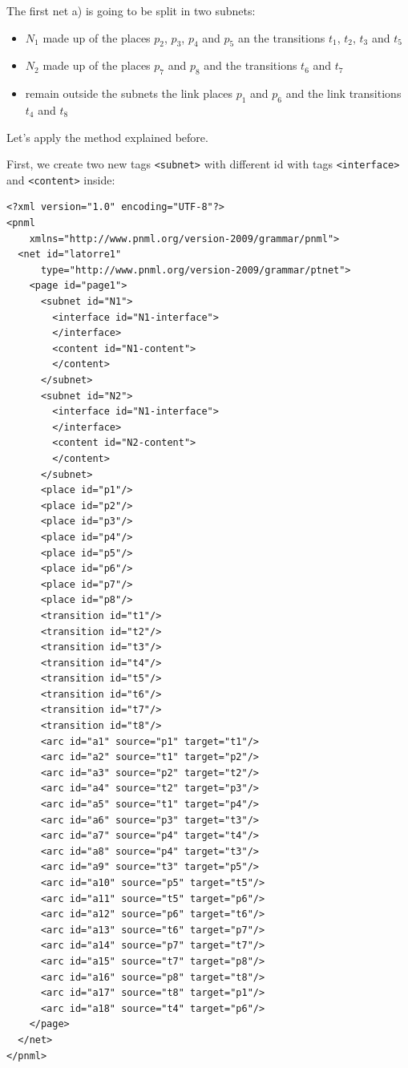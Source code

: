 The first net a) is going to be split in two subnets:
\begin{itemize}
\item $N_1$ made up of the places $p_2$, $p_3$, $p_4$ and $p_5$ an the transitions
$t_1$, $t_2$, $t_3$ and $t_5$
\item $N_2$ made up of the places $p_7$ and $p_8$ and the transitions $t_6$
and $t_7$
\item remain outside the subnets the link places $p_1$ and $p_6$ and the link transitions $t_4$ and $t_8$
\end{itemize}

Let's apply the method explained before.

First, we create two new tags \texttt{<subnet>} with different id with tags
\texttt{<interface>} and  \texttt{<content>} inside:

\begin{lstlisting}
<?xml version="1.0" encoding="UTF-8"?>
<pnml
    xmlns="http://www.pnml.org/version-2009/grammar/pnml">
  <net id="latorre1"
      type="http://www.pnml.org/version-2009/grammar/ptnet">
    <page id="page1">
      <subnet id="N1">
        <interface id="N1-interface">
        </interface>
        <content id="N1-content">
        </content>
      </subnet>
      <subnet id="N2">
        <interface id="N1-interface">
        </interface>
        <content id="N2-content">
        </content>
      </subnet>
      <place id="p1"/>
      <place id="p2"/>
      <place id="p3"/>
      <place id="p4"/>
      <place id="p5"/>
      <place id="p6"/>
      <place id="p7"/>
      <place id="p8"/>
      <transition id="t1"/>
      <transition id="t2"/>
      <transition id="t3"/>
      <transition id="t4"/>
      <transition id="t5"/>
      <transition id="t6"/>
      <transition id="t7"/>
      <transition id="t8"/>
      <arc id="a1" source="p1" target="t1"/>
      <arc id="a2" source="t1" target="p2"/>
      <arc id="a3" source="p2" target="t2"/>
      <arc id="a4" source="t2" target="p3"/>
      <arc id="a5" source="t1" target="p4"/>
      <arc id="a6" source="p3" target="t3"/>
      <arc id="a7" source="p4" target="t4"/>
      <arc id="a8" source="p4" target="t3"/>
      <arc id="a9" source="t3" target="p5"/>
      <arc id="a10" source="p5" target="t5"/>
      <arc id="a11" source="t5" target="p6"/>
      <arc id="a12" source="p6" target="t6"/>
      <arc id="a13" source="t6" target="p7"/>
      <arc id="a14" source="p7" target="t7"/>
      <arc id="a15" source="t7" target="p8"/>
      <arc id="a16" source="p8" target="t8"/>
      <arc id="a17" source="t8" target="p1"/>
      <arc id="a18" source="t4" target="p6"/>
    </page>
  </net>
</pnml>
\end{lstlisting}



